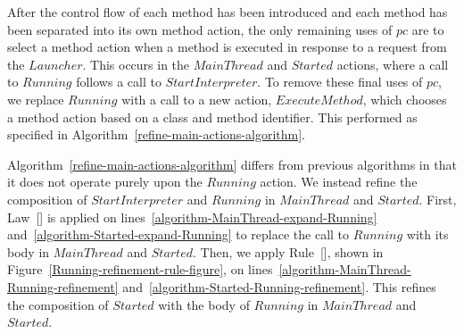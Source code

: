 After the control flow of each method has been introduced and each
method has been separated into its own method action, the only
remaining uses of $pc$ are to select a method action when a method is
executed in response to a request from the $Launcher$.
This occurs in the $MainThread$ and $Started$ actions, where a call to
$Running$ follows a call to $StartInterpreter$.
To remove these final uses of $pc$, we replace $Running$ with a call
to a new action, $ExecuteMethod$, which chooses a method action based
on a class and method identifier.
This performed as specified in
Algorithm~\ref{refine-main-actions-algorithm}.

\begin{algorithm}
  \begin{algorithmic}[1]
    \State {}
    \label{algorithm-MainThread-expand-Running}
    \State {}
    \label{algorithm-Started-expand-Running}
    \State {}
    \label{algorithm-MainThread-Running-refinement}
    \State {}
    \label{algorithm-Started-Running-refinement}
    \State {}
    \label{algorithm-ExecuteMethod-introduction}
    \State {}
    \label{algorithm-MainThread-copy-ExecuteMethod}
    \State {}
    \label{algorithm-Started-copy-ExecuteMethod}
  \end{algorithmic}
  \caption{}
  \label{refine-main-actions-algorithm}
\end{algorithm}

Algorithm~\ref{refine-main-actions-algorithm} differs from previous
algorithms in that it does not operate purely upon the $Running$
action.
We instead refine the composition of $StartInterpreter$ and $Running$
in $MainThread$ and $Started$.
First, Law~[] is applied on
lines~\ref{algorithm-MainThread-expand-Running}
and~\ref{algorithm-Started-expand-Running} to replace the call to
$Running$ with its body in $MainThread$ and $Started$.
Then, we apply Rule~[], shown in
Figure~\ref{Running-refinement-rule-figure}, on
lines~\ref{algorithm-MainThread-Running-refinement}
and~\ref{algorithm-Started-Running-refinement}.
This refines the composition of $Started$ with the body of $Running$
in $MainThread$ and $Started$.

